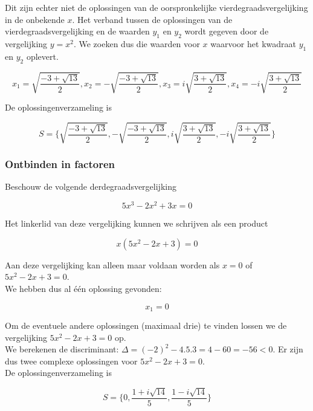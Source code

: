 Dit zijn echter niet de oplossingen van de oorspronkelijke vierdegraadsvergelijking in de onbekende $x$. Het verband tussen de oplossingen van de vierdegraadsvergelijking en de waarden $y_{1}$ en $y_{2}$ wordt gegeven door de vergelijking $y=x^2$. We zoeken dus die waarden voor $x$ waarvoor het kwadraat $y_{1}$ en $y_{2}$ oplevert.

\[ x_{1}=\sqrt{\frac{-3 + \sqrt{13}}{2}} , x_{2}=-\sqrt{\frac{-3 + \sqrt{13}}{2}} , x_{3}=i\sqrt{\frac{3 + \sqrt{13}}{2}} , x_{4}=-i\sqrt{\frac{3 + \sqrt{13}}{2}}     \]

De oplossingenverzameling is

\[ S=\{ \sqrt{\frac{-3 + \sqrt{13}}{2}} , -\sqrt{\frac{-3 + \sqrt{13}}{2}} , i\sqrt{\frac{3 + \sqrt{13}}{2}} , -i\sqrt{\frac{3 + \sqrt{13}}{2}}  \} \]

\subsubsection{Ontbinden in factoren}

Beschouw de volgende derdegraadsvergelijking

\[ 5x^3-2x^2+3x = 0\]

Het linkerlid van deze vergelijking kunnen we schrijven als een product

\[ x(5x^2-2x+3)=0 \]

Aan deze vergelijking kan alleen maar voldaan worden als $x=0$ of $5x^2-2x+3=0$.\\
We hebben dus al \'{e}\'{e}n oplossing gevonden:

\[ x_{1}=0 \]

Om de eventuele andere oplossingen (maximaal drie) te vinden lossen we de vergelijking $5x^2-2x+3=0$ op.\\ We berekenen de discriminant: $\Delta = (-2)^2 - 4.5.3=4-60=-56 <0$. Er zijn dus twee complexe oplossingen voor $5x^2-2x+3=0$.\\

De oplossingenverzameling is

\[ S=\{ 0 , \frac{1+i\sqrt{14}}{5} , \frac{1-i\sqrt{14}}{5} \} \]

